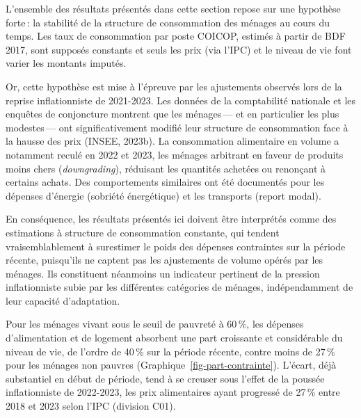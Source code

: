 \documentclass[
  french,
  9pt,
  a4paper,
]{article}
\begin{document}
\begin{tcolorbox}[enhanced jigsaw, leftrule=.75mm, breakable, toptitle=1mm, toprule=.15mm, title={Hypothèse de stabilité de la structure de consommation}, opacityback=0, arc=.35mm, opacitybacktitle=0.6, colback=white, coltitle=black, colframe=quarto-callout-warning-color-frame, left=2mm, colbacktitle=quarto-callout-warning-color!10!white, bottomtitle=1mm, titlerule=0mm, rightrule=.15mm, bottomrule=.15mm]

L'ensemble des résultats présentés dans cette section repose sur une
hypothèse forte\,: la stabilité de la structure de consommation des
ménages au cours du temps. Les taux de consommation par poste COICOP,
estimés à partir de BDF 2017, sont supposés constants et seuls les prix
(via l'IPC) et le niveau de vie font varier les montants imputés.

Or, cette hypothèse est mise à l'épreuve par les ajustements observés
lors de la reprise inflationniste de 2021-2023. Les données de la
comptabilité nationale et les enquêtes de conjoncture montrent que les
ménages\,--- et en particulier les plus modestes\,--- ont
significativement modifié leur structure de consommation face à la
hausse des prix (INSEE, 2023b). La consommation alimentaire en volume a
notamment reculé en 2022 et 2023, les ménages arbitrant en faveur de
produits moins chers (\emph{downgrading}), réduisant les quantités
achetées ou renonçant à certains achats. Des comportements similaires
ont été documentés pour les dépenses d'énergie (sobriété énergétique) et
les transports (report modal).

En conséquence, les résultats présentés ici doivent être interprétés
comme des estimations à structure de consommation constante, qui tendent
vraisemblablement à surestimer le poids des dépenses contraintes sur la
période récente, puisqu'ils ne captent pas les ajustements de volume
opérés par les ménages. Ils constituent néanmoins un indicateur
pertinent de la pression inflationniste subie par les différentes
catégories de ménages, indépendamment de leur capacité d'adaptation.

\end{tcolorbox}

Pour les ménages vivant sous le seuil de pauvreté à 60\,\%, les dépenses
d'alimentation et de logement absorbent une part croissante et
considérable du niveau de vie, de l'ordre de 40\,\% sur la période
récente, contre moins de 27\,\% pour les ménages non pauvres
(Graphique~\ref{fig-part-contrainte}). L'écart, déjà substantiel en
début de période, tend à se creuser sous l'effet de la poussée
inflationniste de 2022-2023, les prix alimentaires ayant progressé de
27\,\% entre 2018 et 2023 selon l'IPC (division C01).
\end{document}
